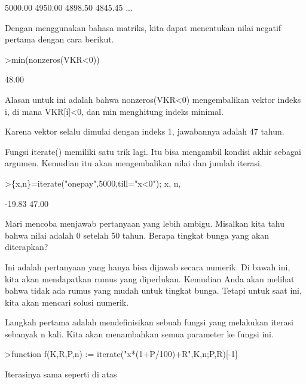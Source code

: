 \documentclass[a4paper,10pt]{article}
\begin{document}
\begin{eulernotebook}
\begin{eulercomment}
\begin{eulercomment}
\begin{eulercomment}
\begin{eulercomment}
\begin{eulercomment}
\begin{eulercomment}
\begin{eulercomment}
\begin{eulercomment}
\begin{eulercomment}
\begin{eulercomment}
\begin{eulercomment}
\begin{eulercomment}
\begin{euleroutput}
      5000.00     4950.00     4898.50     4845.45     ...
\end{euleroutput}
\begin{eulercomment}
Dengan menggunakan bahasa matriks, kita dapat menentukan nilai negatif
pertama dengan cara berikut.
\end{eulercomment}
\begin{eulerprompt}
>min(nonzeros(VKR<0))
\end{eulerprompt}
\begin{euleroutput}
        48.00 
\end{euleroutput}
\begin{eulercomment}
Alasan untuk ini adalah bahwa nonzeros(VKR\textless{}0) mengembalikan vektor
indeks i, di mana VKR[i]\textless{}0, dan min menghitung indeks minimal.

Karena vektor selalu dimulai dengan indeks 1, jawabannya adalah 47
tahun.

Fungsi iterate() memiliki satu trik lagi. Itu bisa mengambil kondisi
akhir sebagai argumen. Kemudian itu akan mengembalikan nilai dan
jumlah iterasi.
\end{eulercomment}
\begin{eulerprompt}
>\{x,n\}=iterate("onepay",5000,till="x<0"); x, n,
\end{eulerprompt}
\begin{euleroutput}
       -19.83 
        47.00 
\end{euleroutput}
\begin{eulercomment}
Mari mencoba menjawab pertanyaan yang lebih ambigu. Misalkan kita tahu
bahwa nilai adalah 0 setelah 50 tahun. Berapa tingkat bunga yang akan
diterapkan?

Ini adalah pertanyaan yang hanya bisa dijawab secara numerik. Di bawah
ini, kita akan mendapatkan rumus yang diperlukan. Kemudian Anda akan
melihat bahwa tidak ada rumus yang mudah untuk tingkat bunga. Tetapi
untuk saat ini, kita akan mencari solusi numerik.

Langkah pertama adalah mendefinisikan sebuah fungsi yang melakukan
iterasi sebanyak n kali. Kita akan menambahkan semua parameter ke
fungsi ini.
\end{eulercomment}
\begin{eulerprompt}
>function f(K,R,P,n) := iterate("x*(1+P/100)+R",K,n;P,R)[-1]
\end{eulerprompt}
\begin{eulercomment}
Iterasinya sama seperti di atas


\end{eulercomment}
\end{eulercomment}
\end{eulercomment}
\end{eulercomment}
\end{eulercomment}
\end{eulercomment}
\end{eulercomment}
\end{eulercomment}
\end{eulercomment}
\end{eulercomment}
\end{eulercomment}
\end{eulercomment}
\end{eulercomment}
\end{eulernotebook}
\end{document}
